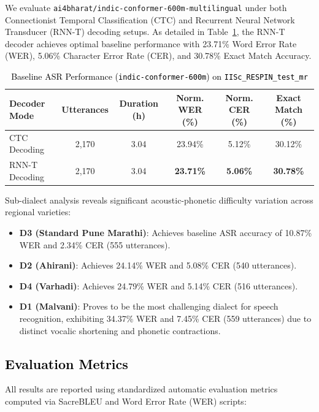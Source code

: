 We evaluate \texttt{ai4bharat/indic-conformer-600m-multilingual} under both Connectionist Temporal Classification (CTC) and Recurrent Neural Network Transducer (RNN-T) decoding setups. As detailed in Table~\ref{tab:asr_baseline}, the RNN-T decoder achieves optimal baseline performance with 23.71\% Word Error Rate (WER), 5.06\% Character Error Rate (CER), and 30.78\% Exact Match Accuracy.

\begin{table}[t]
\color{black}
\centering
\caption{\textcolor{black}{Baseline ASR Performance (\texttt{indic-conformer-600m}) on \texttt{IISc\_RESPIN\_test\_mr}}}
\label{tab:asr_baseline}
\begin{tabular}{lccccc}
\hline
\textbf{Decoder Mode} & \textbf{Utterances} & \textbf{Duration (h)} & \textbf{Norm. WER (\%)} & \textbf{Norm. CER (\%)} & \textbf{Exact Match (\%)} \\
\hline
CTC Decoding  & 2,170 & 3.04 & 23.94\% & 5.12\% & 30.12\% \\
RNN-T Decoding & 2,170 & 3.04 & \textbf{23.71\%} & \textbf{5.06\%} & \textbf{30.78\%} \\
\hline
\end{tabular}
\end{table}

Sub-dialect analysis reveals significant acoustic-phonetic difficulty variation across regional varieties:
\begin{itemize}
    \item \textbf{D3 (Standard Pune Marathi)}: Achieves baseline ASR accuracy of 10.87\% WER and 2.34\% CER (555 utterances).
    \item \textbf{D2 (Ahirani)}: Achieves 24.14\% WER and 5.08\% CER (540 utterances).
    \item \textbf{D4 (Varhadi)}: Achieves 24.79\% WER and 5.14\% CER (516 utterances).
    \item \textbf{D1 (Malvani)}: Proves to be the most challenging dialect for speech recognition, exhibiting 34.37\% WER and 7.45\% CER (559 utterances) due to distinct vocalic shortening and phonetic contractions.
\end{itemize}

\subsection{\textcolor{black}{Evaluation Metrics}}

All results are reported using standardized automatic evaluation metrics computed via SacreBLEU \cite{post2018sacrebleu} and Word Error Rate (WER) scripts:

